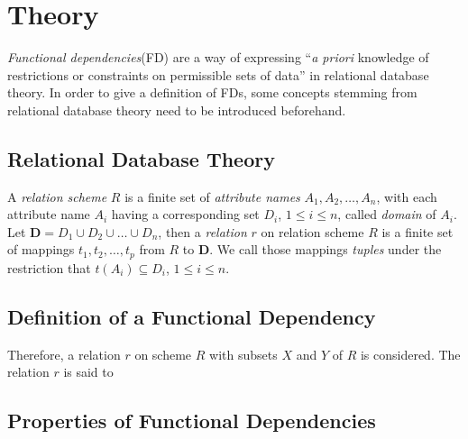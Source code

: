 \newpage
\section{Theory}
\emph{Functional dependencies}(FD) are a way of expressing ``\emph{a priori} knowledge of restrictions or constraints on permissible sets of data''\cite[p.42]{MAI83} in relational database theory. In order to give a definition of FDs, some concepts stemming from relational database theory need to be introduced beforehand.

\subsection{Relational Database Theory}
A \emph{relation scheme} $R$ is a finite set of \emph{attribute names} ${A_1, A_2, \dots, A_n}$, with each attribute name $A_i$ having a corresponding set $D_i$, $1 \leq i \leq n$, called \emph{domain} of $A_i$. Let $\boldsymbol{D} = D_1 \cup D_2 \cup \dots \cup D_n$, then a \emph{relation} $r$ on relation scheme $R$ is a finite set of mappings ${t_1, t_2, \dots, t_p}$ from $R$ to $\boldsymbol{D}$. We call those mappings \emph{tuples} under the restriction that $t(A_i) \subseteq D_i$, $1 \leq i \leq n$.\cite[p.2]{MAI83}


\subsection{Definition of a Functional Dependency}
Therefore, a relation $r$ on scheme $R$ with subsets $X$ and $Y$ of $R$ is considered. The relation $r$ is said to 
\subsection{Properties of Functional Dependencies}

